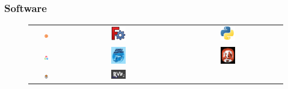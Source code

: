 \documentclass{beamer}
\begin{document}
\begin{frame}
	\frametitle{Software}
	\begin{figure}
	\centering
	\begin{tabular}{ccc} %
		\includegraphics[width=0.14\textwidth]{figs/ubuntu.png} & 
		\includegraphics[width=0.14\textwidth]{figs/freecad.png} & 
		\includegraphics[width=0.14\textwidth]{figs/python.png} \\
		\includegraphics[width=0.14\textwidth]{figs/opencv.png} & 
		\includegraphics[width=0.14\textwidth]{figs/humble.png} & 
		\includegraphics[width=0.14\textwidth]{figs/foxy.png} \\
		\includegraphics[width=0.14\textwidth]{figs/gazebo.png} & 
		\includegraphics[width=0.14\textwidth]{figs/rviz.png} & 

\end{tabular}
\end{figure}
\end{frame}
\end{document}
